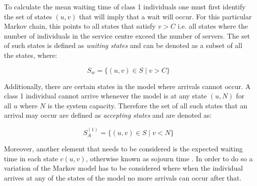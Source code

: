 To calculate the mean waiting time of class 1 individuals one must first identify 
the set of states \((u, v)\) that will imply that a wait will occur. 
For this particular Markov chain, this points to all states that satisfy \(v > C\) 
i.e. all states where the number of individuals in the service centre exceed the 
number of servers. 
The set of such states is defined as \textit{waiting states} and can be denoted 
as a subset of all the states, where:

\begin{equation} \label{eq:waiting_states}
    S_w = \{(u, v) \in S \; | \; v > C \}    
\end{equation}

Additionally, there are certain states in the model where arrivals cannot occur. 
A class 1 individual cannot arrive whenever the model is at any state 
\((u, N)\) 
for all \(u\) where \(N\) is the system capacity. 
Therefore the set of all such states that an arrival may occur are defined as 
\textit{accepting states} and are denoted as:

\begin{equation}\label{eq:accepting_states_class_1}
    S_A^{(1)} = \{(u, v) \in S \; | \; v < N \}
\end{equation}



Moreover, another element that needs to be considered is the expected waiting time 
in each state \( c(u,v) \), otherwise known as sojourn time \cite{Raghunandanan}. 
In order to do so a variation of the Markov model has to be considered where when 
the individual arrives at any of the states of the model no more arrivals can 
occur after that. 



